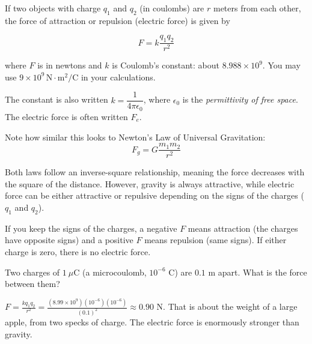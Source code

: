 \begin{mdframed}
	[style=important, frametitle={Coulomb's Law}]

	If two objects with charge $q_{1}$ and $q_{2}$ (in coulombs) are $r$ meters
	from each other, the force of attraction or repulsion (electric force) is given
	by

	\begin{equation}
		F = k\frac{ q_{1}q_{2}}{r^{2}}
		\label{eq:coulomb_law}
	\end{equation}


	where $F$ is in newtons and $k$ is Coulomb's constant: about
	$8.988 \times 10^{9}$. You may use $9 \times 10^{9}\, \mathrm{N}\cdot \mathrm{m}
		^{2}/ \mathrm{C}$ in your calculations.

	The constant is also written $k = \dfrac{1}{4\pi \epsilon_0}$, where
	$\epsilon_{0}$ is the \textit{permittivity of free space}.\footnotemark
	The electric force is often written $F_{e}$.
\end{mdframed}
Note how similar this looks to Newton's Law of Universal Gravitation:
\[
	F_{g}= G \frac{m_{1}m_{2}}{r^{2}}
\]

Both laws follow an inverse-square relationship, meaning the force decreases with
the square of the distance. However, gravity is always attractive, while
electric force can be either attractive or repulsive depending on the signs of
the charges ($q_1$ and $q_2$).

If you keep the signs of the charges, a negative $F$ means attraction (the
charges have opposite signs) and a positive $F$ means repulsion (same
signs). If either charge is zero, there is no electric force.

\begin{Worked}
\begin{Problem}
Two charges of $1\ \mu$C (a microcoulomb,
$10^{-6}$ C) are $0.1$ m apart. What is the force between them?
\end{Problem}
\begin{Solution}
$F = \frac{kq_1q_2}{r^2} = \frac{(8.99 \times 10^9)(10^{-6})(10^{-6})}{(0.1)^2} \approx 0.90$ N.
That is about the weight of a large apple, from two specks of charge. The
electric force is enormously stronger than gravity.
\end{Solution}
\end{Worked}

